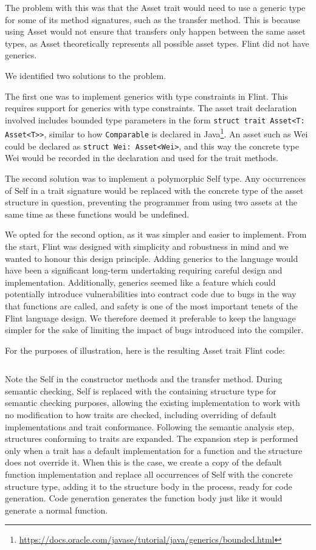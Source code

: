 The problem with this was that the Asset trait would need to use a generic type for some of its method signatures, such as the transfer method. This is because using Asset would not ensure that transfers only happen between the same asset types, as Asset theoretically represents all possible asset types. Flint did not have generics.

We identified two solutions to the problem. 

The first one was to implement generics with type constraints in Flint. This requires support for generics with type constraints. The asset trait declaration involved includes bounded type parameters in the form \texttt{struct trait Asset<T: Asset<T>>}, similar to how \texttt{Comparable} is declared in Java\footnote{\url{https://docs.oracle.com/javase/tutorial/java/generics/bounded.html}}. An asset such as Wei could be declared as \texttt{struct Wei: Asset<Wei>}, and this way the concrete type Wei would be recorded in the declaration and used for the trait methods.

The second solution was to implement a polymorphic Self type. Any occurrences of Self in a trait signature would be replaced with the concrete type of the asset structure in question, preventing the programmer from using two assets at the same time as these functions would be undefined.

We opted for the second option, as it was simpler and easier to implement. From the start, Flint was designed with simplicity and robustness in mind and we wanted to honour this design principle. Adding generics to the language would have been a significant long-term undertaking requiring careful design and implementation. Additionally, generics seemed like a feature which could potentially introduce vulnerabilities into contract code due to bugs in the way that functions are called, and safety is one of the most important tenets of the Flint language design. We therefore deemed it preferable to keep the language simpler for the sake of limiting the impact of bugs introduced into the compiler.

For the purposes of illustration, here is the resulting Asset trait Flint code:

\inputminted{swift}{code/asset.flint}

Note the Self in the constructor methods and the transfer method. During semantic checking, Self is replaced with the containing structure type for semantic checking purposes, allowing the existing implementation to work with no modification to how traits are checked, including overriding of default implementations and trait conformance. Following the semantic analysis step, structures conforming to traits are expanded. The expansion step is performed only when a trait has a default implementation for a function and the structure does not override it. When this is the case, we create a copy of the default function implementation and replace all occurrences of Self with the concrete structure type, adding it to the structure body in the process, ready for code generation. Code generation generates the function body just like it would generate a normal function.

